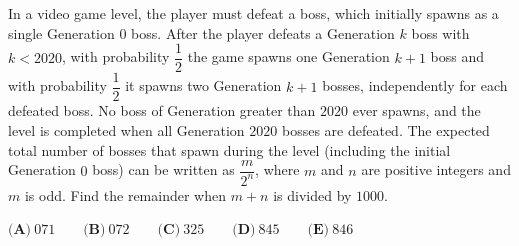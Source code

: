 In a video game level, the player must defeat a boss, which initially spawns as a single Generation $0$ boss. After the player defeats a Generation $k$ boss with $k<2020$, with probability $\dfrac{1}{2}$ the game spawns one Generation $k+1$ boss and with probability $\dfrac{1}{2}$ it spawns two Generation $k+1$ bosses, independently for each defeated boss. No boss of Generation greater than $2020$ ever spawns, and the level is completed when all Generation $2020$ bosses are defeated. The expected total number of bosses that spawn during the level (including the initial Generation $0$ boss) can be written as $\dfrac{m}{2^n}$, where $m$ and $n$ are positive integers and $m$ is odd. Find the remainder when $m+n$ is divided by $1000$.

$\textbf{(A)}\ 071 \qquad\textbf{(B)}\ 072 \qquad\textbf{(C)}\ 325 \qquad\textbf{(D)}\ 845 \qquad\textbf{(E)}\ 846$
